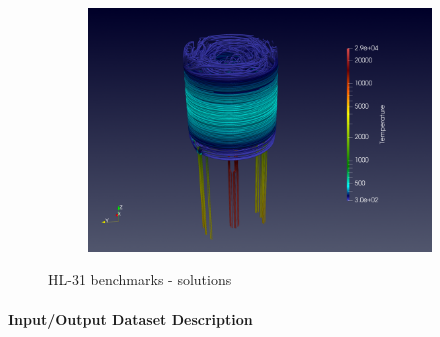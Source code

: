 \begin{figure}[h]
\begin{subfigure}[c]{0.49\textwidth}
  \end{subfigure}
  \hfill
  \begin{subfigure}[c]{0.49\textwidth}
    \centering
    \includegraphics[width=\textwidth]{graphics/feelpp/feelpp-benchmark-HL-31-temperature-streamlines.png}
  \end{subfigure}
  \caption{HL-31 benchmarks - solutions}
  \label{fig:wp1:feelpp:hl-31:visualization-solution}
\end{figure}


\paragraph{Input/Output Dataset Description}

